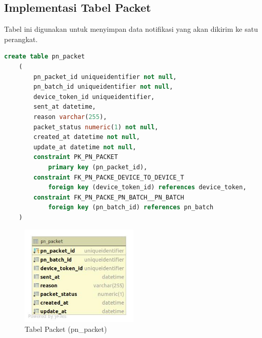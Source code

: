 \subsection{Implementasi Tabel Packet}
\par Tabel ini digunakan untuk menyimpan data notifikasi yang akan dikirim ke satu perangkat.
\begin{lstlisting}[language=sql, firstnumber=1, caption=Implementasi Tabel Packet]
    create table pn_packet
    (
        pn_packet_id uniqueidentifier not null,
        pn_batch_id uniqueidentifier not null,
        device_token_id uniqueidentifier,
        sent_at datetime,
        reason varchar(255),
        packet_status numeric(1) not null,
        created_at datetime not null,
        update_at datetime not null,
        constraint PK_PN_PACKET
            primary key (pn_packet_id),
        constraint FK_PN_PACKE_DEVICE_TO_DEVICE_T
            foreign key (device_token_id) references device_token,
        constraint FK_PN_PACKE_PN_BATCH__PN_BATCH
            foreign key (pn_batch_id) references pn_batch
    )
\end{lstlisting}
\begin{figure}[H]
    \centering\includegraphics[width=0.5\textwidth]{bab4/figures/tabel_pn_packet.jpg}
    \caption{Tabel Packet (pn\_packet)}
    \label{tabel_pn_packet}
\end{figure}

